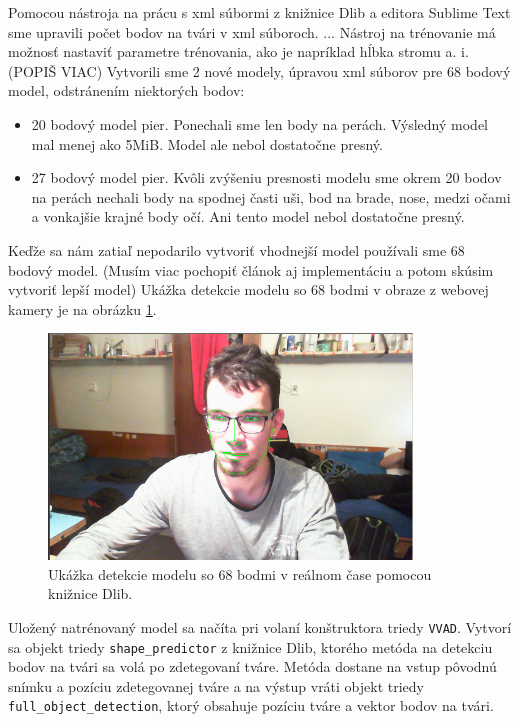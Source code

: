 Pomocou nástroja na prácu s xml súbormi z knižnice Dlib a editora Sublime Text sme upravili počet bodov na tvári v xml súboroch.
...
Nástroj na trénovanie má možnosť nastaviť parametre trénovania, ako je napríklad hĺbka stromu a. i. (POPIŠ VIAC)
Vytvorili sme 2 nové modely, úpravou xml súborov pre 68 bodový model, odstránením niektorých bodov:
\begin{itemize}
	\item 20 bodový model pier. 
	Ponechali sme len body na perách. 
	Výsledný model mal menej ako 5MiB.
	Model ale nebol dostatočne presný.
	\item 27 bodový model pier.
	Kvôli zvýšeniu presnosti modelu sme okrem 20 bodov na perách nechali body na spodnej časti uši, bod na brade, nose, medzi očami a vonkajšie krajné body očí.
	Ani tento model nebol dostatočne presný.
\end{itemize}

Keďže sa nám zatiaľ nepodarilo vytvoriť vhodnejší model používali sme 68 bodový model.
(Musím viac pochopiť článok aj implementáciu a potom skúsim vytvoriť lepší model)
Ukážka detekcie modelu so 68 bodmi v obraze z webovej kamery je na obrázku \ref{pic-detekciaKsicht}.

\begin{figure}[H]
	\begin{center}
		\includegraphics[height=6cm]{pics/detekciaKsicht.png}
		\caption{Ukážka detekcie modelu so 68 bodmi v reálnom čase pomocou knižnice Dlib.}
		\label{pic-detekciaKsicht}
	\end{center}
\end{figure}

Uložený natrénovaný model sa načíta pri volaní konštruktora triedy \texttt{VVAD}.
Vytvorí sa objekt triedy \texttt{shape\_predictor} z knižnice Dlib, ktorého metóda na detekciu bodov na tvári sa volá po zdetegovaní tváre.
Metóda dostane na vstup pôvodnú snímku a pozíciu zdetegovanej tváre a na výstup vráti objekt triedy \texttt{full\_object\_detection}, ktorý obsahuje pozíciu tváre a vektor bodov na tvári.

